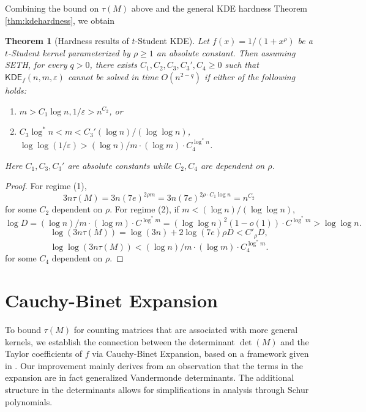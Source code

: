 \documentclass[10pt,a4paper]{article}
\newtheorem{theorem}{Theorem}
\theoremstyle{remark}
\numberwithin{equation}{section}
\numberwithin{theorem}{section}
\newcommand{\eps}{\varepsilon}
\newcommand{\KDE}{\mathsf{KDE}}
\begin{document}
Combining the bound on $\tau(M)$ above and the general KDE hardness Theorem \ref{thm:kdehardness}, we obtain
\begin{theorem}[Hardness results of $t$-Student KDE]
Let $f(x) = 1/(1+x^\rho)$ be a $t$-Student kernel parameterized by $\rho \ge 1$ an absolute constant.
Then assuming SETH, for every $q > 0$, there exists $C_1, C_2, C_3, C_3', C_4 \ge 0$ such that $\KDE_f(n, m, \eps)$ cannot be solved in time $O(n^{2-q})$ if either of the following holds:
\begin{enumerate}[(1)]
\item $m > C_1\log n, 1/\eps > n^{C_2}$, or
\item $C_3\log^* n < m < C_3'(\log n)/(\log\log n)$, $\log\log(1/\eps) > (\log n)/m \cdot (\log m) \cdot C_4^{\log^*n}$.
\end{enumerate}
Here $C_1, C_3, C_3'$ are absolute constants while $C_2, C_4$ are dependent on $\rho$.
\end{theorem}
\begin{proof}
For regime (1), 
\[3n\tau(M) = 3n(7e)^{2\rho m} = 3n(7e)^{2\rho \cdot C_1\log n} = n^{C_2}\]
for some $C_2$ dependent on $\rho$. For regime (2), if $m < (\log n)/(\log \log n)$,
\[\log D = (\log n)/m \cdot (\log m) \cdot C^{\log^* m}
= (\log\log n)^2(1 - o(1)) \cdot C^{\log^* m} > \log \log n.\]
\[\log(3n\tau(M)) = \log(3n) + 2\log(7e)\rho D < C'_\rho D,\]
\[\log\log(3n\tau(M)) < (\log n)/m \cdot (\log m) \cdot C_4^{\log^* m}.\]
for some $C_4$ dependent on $\rho$.
\end{proof}

\section{Cauchy-Binet Expansion} \label{sec:cauchybinet}
To bound $\tau(M)$ for counting matrices that are associated with more general kernels, we establish the connection between the determinant $\det(M)$ and the Taylor coefficients of $f$ via Cauchy-Binet Expansion, based on a framework given in \cite{ACSS20}. Our improvement mainly derives from an observation that the terms in the expansion are in fact generalized Vandermonde determinants. The additional structure in the determinants allows for simplifications in analysis through Schur polynomials.
\end{document}
